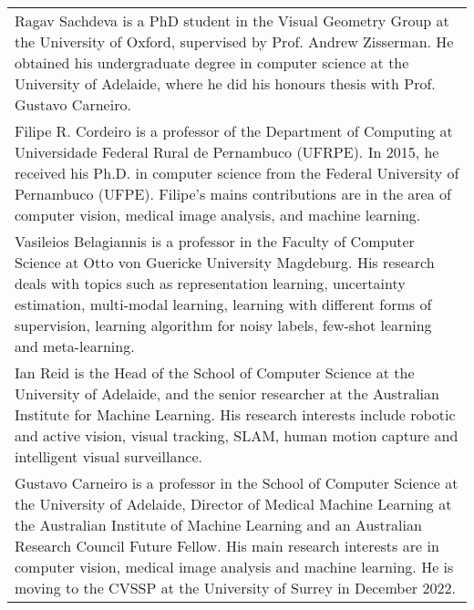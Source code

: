 \documentclass[review]{elsarticle}
\theoremstyle{plain}
\begin{document}
\begin{minipage}{0.60\textwidth}\fontsize{8pt}{12pt}\selectfont
\begin{tabular}{p{\textwidth}}
\thispagestyle{empty}
Ragav Sachdeva is a PhD student in the Visual Geometry Group at the University of Oxford, supervised by Prof. Andrew Zisserman. He obtained his undergraduate degree in computer science at the University of Adelaide, where he did his honours thesis with Prof. Gustavo Carneiro.
\\[1\baselineskip]
Filipe R. Cordeiro is a professor of the Department of Computing at Universidade Federal Rural de Pernambuco (UFRPE). In 2015, he received his Ph.D. in computer science from the Federal University of Pernambuco (UFPE). Filipe's mains contributions are in the area of computer vision, medical image analysis, and machine learning.
\\[1\baselineskip]
Vasileios Belagiannis is a professor in the Faculty of Computer Science at Otto von Guericke University Magdeburg. His research deals with topics such as representation learning, uncertainty estimation, multi-modal learning, learning with different forms of supervision, learning algorithm for noisy labels, few-shot learning and meta-learning.
\\[1\baselineskip]
Ian Reid is the Head of the School of Computer Science at the University of Adelaide, and the senior researcher at the Australian Institute for Machine Learning. His research interests include robotic and active vision, visual tracking, SLAM, human motion capture and intelligent visual surveillance.
\\[1\baselineskip]
Gustavo Carneiro is a professor in the School of Computer Science at the University of Adelaide, Director of Medical Machine Learning at the Australian Institute of Machine Learning and an Australian Research Council Future Fellow. His main research interests are in computer vision, medical image analysis and machine learning. He is moving to the CVSSP at the University of Surrey in December 2022.

\end{tabular}
\end{minipage}
\end{document}
